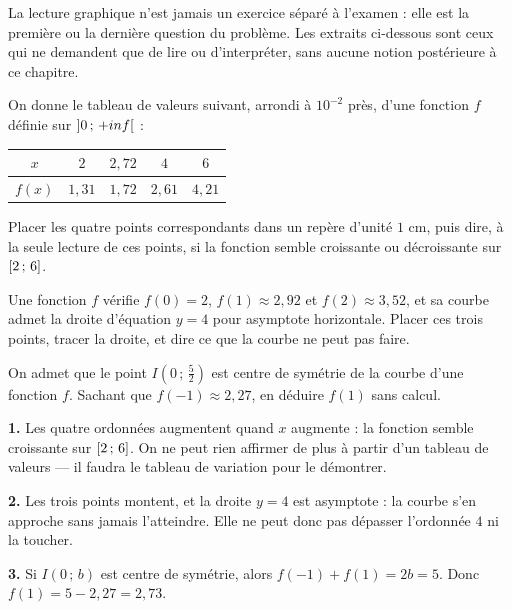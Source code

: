\begin{annales}
La lecture graphique n'est jamais un exercice séparé à l'examen : elle est
la première ou la dernière question du problème. Les extraits ci-dessous sont
ceux qui ne demandent que de lire ou d'interpréter, sans aucune notion
postérieure à ce chapitre.

On donne le tableau de valeurs suivant, arrondi à $10^{-2}$ près, d'une
fonction $f$ définie sur $\left]0\,;\,+inf\right[$ :

\begin{center}\footnotesize
\begin{tabular}{|c|c|c|c|c|}
\hline
$x$ & $2$ & $2{,}72$ & $4$ & $6$\\
\hline
$f(x)$ & $1{,}31$ & $1{,}72$ & $2{,}61$ & $4{,}21$\\
\hline
\end{tabular}
\end{center}

Placer les quatre points correspondants dans un repère d'unité $1$ cm, puis
dire, à la seule lecture de ces points, si la fonction semble croissante ou
décroissante sur $\left[2\,;\,6\right]$.

Une fonction $f$ vérifie $f(0) = 2$, $f(1) \approx 2{,}92$ et
$f(2) \approx 3{,}52$, et sa courbe admet la droite d'équation $y = 4$ pour
asymptote horizontale. Placer ces trois points, tracer la droite, et dire ce
que la courbe ne peut pas faire.

On admet que le point $I\left(0\,;\,\frac52\right)$ est centre de symétrie de
la courbe d'une fonction $f$. Sachant que $f(-1) \approx 2{,}27$, en déduire
$f(1)$ sans calcul.
\end{annales}

\begin{corrige}[annales]
\textbf{1.} Les quatre ordonnées augmentent quand $x$ augmente : la fonction
semble croissante sur $\left[2\,;\,6\right]$. On ne peut rien affirmer de plus
à partir d'un tableau de valeurs — il faudra le tableau de variation pour le
démontrer.

\textbf{2.} Les trois points montent, et la droite $y = 4$ est asymptote :
la courbe s'en approche sans jamais l'atteindre. Elle ne peut donc pas
dépasser l'ordonnée $4$ ni la toucher.

\textbf{3.} Si $I(0\,;\,b)$ est centre de symétrie, alors
$f(-1)+f(1) = 2b = 5$. Donc $f(1) = 5-2{,}27 = 2{,}73$.
\end{corrige}

